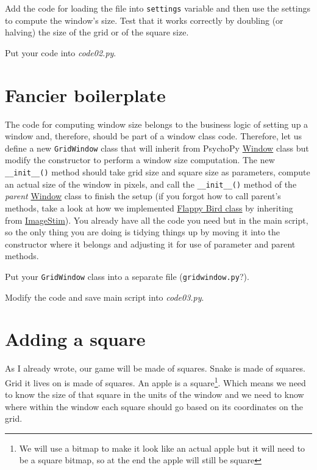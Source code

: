 \documentclass[
]{book}
\begin{document}
Add the code for loading the file into \texttt{settings} variable and then use the settings to compute the window's size. Test that it works correctly by doubling (or halving) the size of the grid or of the square size.

Put your code into \emph{code02.py}.

\hypertarget{fancier-boilerplate}{%
\section{Fancier boilerplate}\label{fancier-boilerplate}}

The code for computing window size belongs to the business logic of setting up a window and, therefore, should be part of a window class code. Therefore, let us define a new \texttt{GridWindow} class that will inherit from PsychoPy \href{https://psychopy.org/api/visual/window.html\#psychopy.visual.Window}{Window} class but modify the constructor to perform a window size computation. The new \texttt{\_\_init\_\_()} method should take grid size and square size as parameters, compute an actual size of the window in pixels, and call the \texttt{\_\_init\_\_()} method of the \emph{parent} \href{https://psychopy.org/api/visual/window.html\#psychopy.visual.Window}{Window} class to finish the setup (if you forgot how to call parent's methods, take a look at how we implemented \protect\hyperlink{flappy-bird-class}{Flappy Bird class} by inheriting from \href{https://psychopy.org/api/visual/imagestim.html\#psychopy.visual.ImageStim}{ImageStim}). You already have all the code you need but in the main script, so the only thing you are doing is tidying things up by moving it into the constructor where it belongs and adjusting it for use of parameter and parent methods.

Put your \texttt{GridWindow} class into a separate file (\texttt{gridwindow.py}?).

Modify the code and save main script into \emph{code03.py}.

\hypertarget{adding-a-square}{%
\section{Adding a square}\label{adding-a-square}}

As I already wrote, our game will be made of squares. Snake is made of squares. Grid it lives on is made of squares. An apple is a square\footnote{We will use a bitmap to make it look like an actual apple but it will need to be a square bitmap, so at the end the apple will still be square}. Which means we need to know the size of that square in the units of the window and we need to know where within the window each square should go based on its coordinates on the grid.
\end{document}
